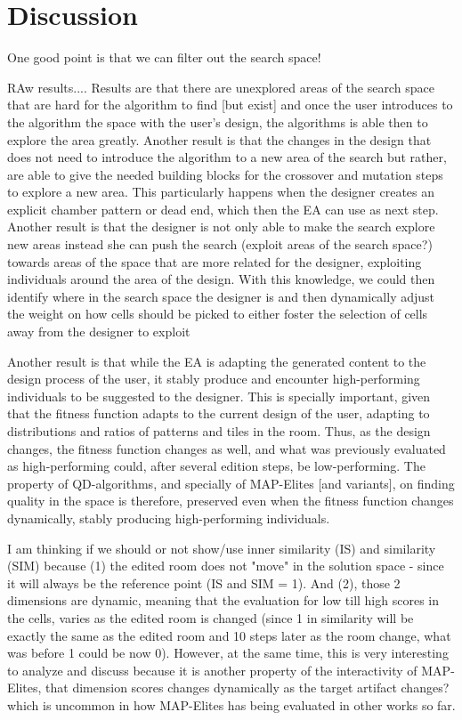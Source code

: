 \section{Discussion}

One good point is that we can filter out the search space! 

RAw results....
Results are that there are unexplored areas of the search space that are hard for the algorithm to find [but exist] and once the user introduces to the algorithm the space with the user’s design, the algorithms is able then to explore the area greatly. Another result is that the changes in the design that does not need to introduce the algorithm to a new area of the search but rather, are able to give the needed building blocks for the crossover and mutation steps to explore a new area. This particularly happens when the designer creates an explicit chamber pattern or dead end, which then the EA can use as next step. Another result is that the designer is not only able to make the search explore new areas instead she can push the search (exploit areas of the search space?) towards areas of the space that are more related for the designer, exploiting individuals around the area of the design. With this knowledge, we could then identify where in the search space the designer is and then dynamically adjust the weight on how cells should be picked to either foster the selection of cells away from the designer to exploit 

Another result is that while the EA is adapting the generated content to the design process of the user, it stably produce and encounter high-performing individuals to be suggested to the designer. This is specially important, given that the fitness function adapts to the current design of the user, adapting to distributions and ratios of patterns and tiles in the room. Thus, as the design changes, the fitness function changes as well, and what was previously evaluated as high-performing could, after several edition steps, be low-performing. The property of QD-algorithms, and specially of MAP-Elites [and variants], on finding quality in the space is therefore, preserved even when the fitness function changes dynamically, stably producing high-performing individuals. 


I am thinking if we should or not show/use inner similarity (IS) and similarity (SIM) because (1) the edited room does not "move" in the solution space - since it will always be the reference point (IS and SIM = 1). And (2), those 2 dimensions are dynamic, meaning that the evaluation for low till high scores in the cells, varies as the edited room is changed (since 1 in similarity will be exactly the same as the edited room and 10 steps later as the room change, what was before 1 could be now 0). However, at the same time, this is very interesting to analyze and discuss because it is another property of the interactivity of MAP-Elites, that dimension scores changes dynamically as the target artifact changes? which is uncommon in how MAP-Elites has being evaluated in other works so far.


